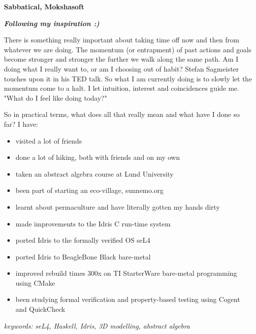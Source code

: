 \item[2016-] \textbf{Sabbatical, Mokshasoft}

\textit{\textbf{Following my inspiration :)}}

There is something really important about taking time off now and then from whatever we are doing. The momentum (or entrapment) of past actions and goals become stronger and stronger the further we walk along the same path. Am I doing what I really want to, or am I choosing out of habit? Stefan Sagmeister touches upon it in his TED talk. So what I am currently doing is to slowly let the momentum come to a halt. I let intuition, interest and coincidences guide me. "What do I feel like doing today?"

So in practical terms, what does all that really mean and what have I done so far? I have:

\begin{itemize}
    \item visited a lot of friends
    \item done a lot of hiking, both with friends and on my own
    \item taken an abstract algebra course at Lund University
    \item been part of starting an eco-village, sunnemo.org
    \item learnt about permaculture and have literally gotten my hands dirty
    \item made improvements to the Idris C run-time system
    \item ported Idris to the formally verified OS seL4
    \item ported Idris to BeagleBone Black bare-metal
    \item improved rebuild times 300x on TI StarterWare bare-metal programming using CMake
    \item been studying formal verification and property-based testing using Cogent and QuickCheck
\end{itemize}

\textit{keywords: seL4, Haskell, Idris, 3D modelling, abstract algebra}
